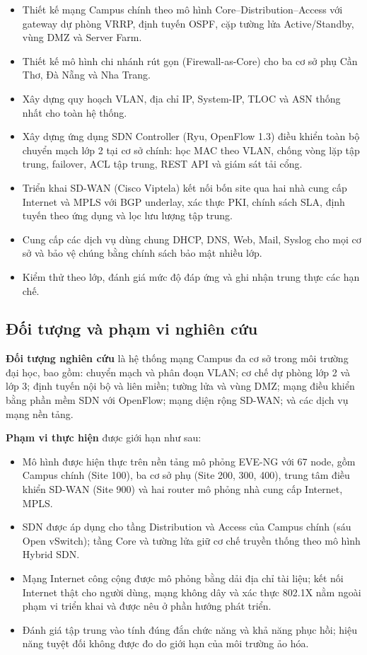 \begin{itemize}
    \item Thiết kế mạng Campus chính theo mô hình Core--Distribution--Access với gateway dự phòng VRRP, định tuyến OSPF, cặp tường lửa Active/Standby, vùng DMZ và Server Farm.
    \item Thiết kế mô hình chi nhánh rút gọn (Firewall-as-Core) cho ba cơ sở phụ Cần Thơ, Đà Nẵng và Nha Trang.
    \item Xây dựng quy hoạch VLAN, địa chỉ IP, System-IP, TLOC và ASN thống nhất cho toàn hệ thống.
    \item Xây dựng ứng dụng SDN Controller (Ryu, OpenFlow 1.3) điều khiển toàn bộ chuyển mạch lớp 2 tại cơ sở chính: học MAC theo VLAN, chống vòng lặp tập trung, failover, ACL tập trung, REST API và giám sát tải cổng.
    \item Triển khai SD-WAN (Cisco Viptela) kết nối bốn site qua hai nhà cung cấp Internet và MPLS với BGP underlay, xác thực PKI, chính sách SLA, định tuyến theo ứng dụng và lọc lưu lượng tập trung.
    \item Cung cấp các dịch vụ dùng chung DHCP, DNS, Web, Mail, Syslog cho mọi cơ sở và bảo vệ chúng bằng chính sách bảo mật nhiều lớp.
    \item Kiểm thử theo lớp, đánh giá mức độ đáp ứng và ghi nhận trung thực các hạn chế.
\end{itemize}

\subsection{Đối tượng và phạm vi nghiên cứu}

\textbf{Đối tượng nghiên cứu} là hệ thống mạng Campus đa cơ sở trong môi trường đại học, bao gồm: chuyển mạch và phân đoạn VLAN; cơ chế dự phòng lớp 2 và lớp 3; định tuyến nội bộ và liên miền; tường lửa và vùng DMZ; mạng điều khiển bằng phần mềm SDN với OpenFlow; mạng diện rộng SD-WAN; và các dịch vụ mạng nền tảng.

\textbf{Phạm vi thực hiện} được giới hạn như sau:
\begin{itemize}
    \item Mô hình được hiện thực trên nền tảng mô phỏng EVE-NG với 67 node, gồm Campus chính (Site 100), ba cơ sở phụ (Site 200, 300, 400), trung tâm điều khiển SD-WAN (Site 900) và hai router mô phỏng nhà cung cấp Internet, MPLS.
    \item SDN được áp dụng cho tầng Distribution và Access của Campus chính (sáu Open vSwitch); tầng Core và tường lửa giữ cơ chế truyền thống theo mô hình Hybrid SDN.
    \item Mạng Internet công cộng được mô phỏng bằng dải địa chỉ tài liệu; kết nối Internet thật cho người dùng, mạng không dây và xác thực 802.1X nằm ngoài phạm vi triển khai và được nêu ở phần hướng phát triển.
    \item Đánh giá tập trung vào tính đúng đắn chức năng và khả năng phục hồi; hiệu năng tuyệt đối không được đo do giới hạn của môi trường ảo hóa.
\end{itemize}

